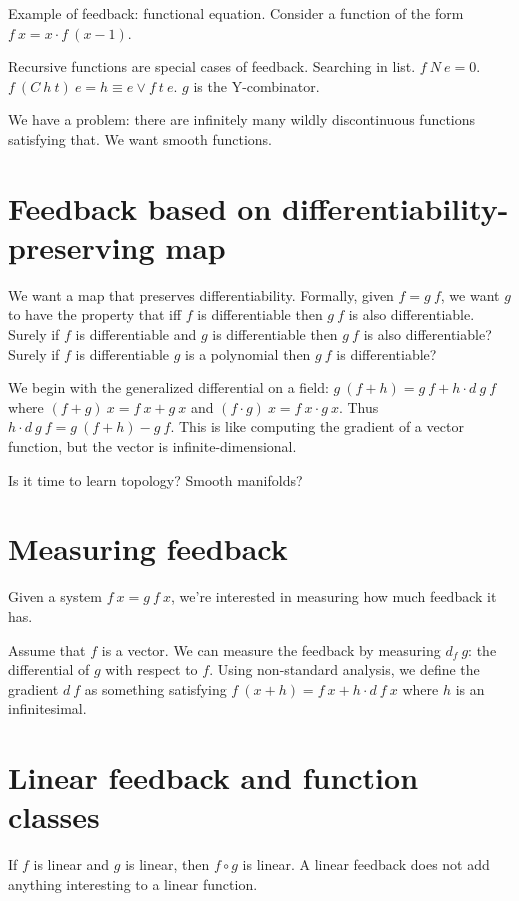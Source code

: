 Example of feedback: functional equation.
Consider a function of the form \(f~x = x \cdot f~(x-1)\).

Recursive functions are special cases of feedback.
Searching in list.
\(f~N~e = 0\).
\(f~(C~h~t)~e = h \equiv e \vee f~t~e\).
\(g\) is the Y-combinator.

We have a problem: there are infinitely many wildly discontinuous functions satisfying that.
We want smooth functions.

\section{Feedback based on differentiability-preserving map}

We want a map that preserves differentiability.
Formally, given \(f=g~f\), we want \(g\) to have the property
that iff \(f\) is differentiable then \(g~f\) is also differentiable.
Surely if \(f\) is differentiable and \(g\) is differentiable then \(g~f\) is also differentiable?
Surely if \(f\) is differentiable \(g\) is a polynomial then \(g~f\) is differentiable?

We begin with the generalized differential on a field:
\( g~(f+h) = g~f + h \cdot d~g~f \)
where \( (f + g)~x = f~x + g~x \) and \( (f \cdot g)~x = f~x \cdot g~x \).
Thus \( h \cdot d~g~f = g~(f+h) - g~f \).
This is like computing the gradient of a vector function,
but the vector is infinite-dimensional.

Is it time to learn topology? Smooth manifolds?

\section{Measuring feedback}

Given a system \( f~x = g~f~x \),
we're interested in measuring how much feedback it has.

Assume that \(f\) is a vector.
We can measure the feedback by measuring \( d_f ~ g \):
the differential of \(g\) with respect to \(f\).
Using non-standard analysis, we define the gradient \( d~f \)
as something satisfying \( f~(x + h) = f~x + h \cdot d~f~x \)
where \(h\) is an infinitesimal.

\section{Linear feedback and function classes}

If \(f\) is linear and \(g\) is linear, then \(f \circ g\) is linear.
A linear feedback does not add anything interesting to a linear function.
